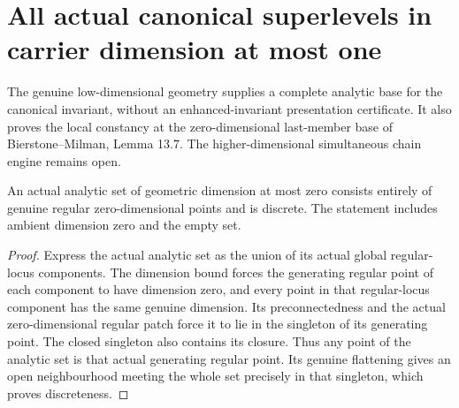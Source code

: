 \section{All actual canonical superlevels in carrier dimension at most one}

The genuine low-dimensional geometry supplies a complete analytic base for
the canonical invariant, without an enhanced-invariant presentation
certificate. It also proves the local constancy at the zero-dimensional
last-member base of Bierstone--Milman\cite{bierstone-milman97-invent-math},
Lemma 13.7. The higher-dimensional simultaneous chain engine remains open.

\begin{lemma}
\label{hir:analytic-dimzero-all-points-regular}
\leanok
An actual analytic set of geometric dimension at most zero consists
entirely of genuine regular zero-dimensional points and is discrete.
The statement includes ambient dimension zero and the empty set.
\end{lemma}
\begin{proof}
Express the actual analytic set as the union of its actual global
regular-locus components. The dimension bound forces the generating
regular point of each component to have dimension zero, and every
point in that regular-locus component has the same genuine dimension.
Its preconnectedness and the actual zero-dimensional regular patch
force it to lie in the singleton of its generating point. The closed
singleton also contains its closure. Thus any point of the analytic
set is that actual generating regular point. Its genuine flattening
gives an open neighbourhood meeting the whole set precisely in that
singleton, which proves discreteness.
\end{proof}

